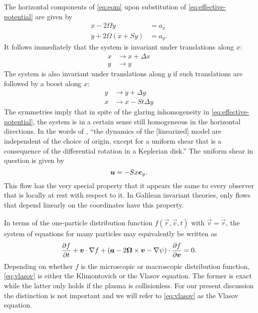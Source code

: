 \documentclass[aps,pre,notitlepage,amsmath,amssymb,amsfonts,nobibnotes,nofootinbib,superscriptaddress,onecolumn,a4paper,10pt]{revtex4-1}
\begin{document}
The horizontal components of \cref{eq:eom} upon substitution of
\cref{eq:effective-potential} are given by
\begin{align}
  \ddot{x} - 2\Omega\dot{y} &= a_x \\
  \label{eq:eom-y}
  \ddot{y} + 2\Omega(\dot{x} + Sy) &= a_y.
\end{align}
It follows immediately that the system is invariant under translations along
$x$:
\begin{equation}
  \label{eq:trans-x}
  \begin{aligned}
    x &\to x + \Delta x \\
    y &\to y
  \end{aligned}
\end{equation}
The system is also invariant under translations along $y$ if such translations
are followed by a boost along $x$:
\begin{equation}
  \label{eq:trans-y}
  \begin{aligned}
    y &\to y + \Delta y \\
    x &\to x - St\Delta y
  \end{aligned}
\end{equation}
The symmetries  imply that in spite of the
glaring inhomogeneity in \cref{eq:effective-potential}, the system is in a
certain sense still homogeneous in the horizontal directions. In the words of
\citet{Wisdom1988}, ``the dynamics of the [linearized] model are independent
of the choice of origin, except for a uniform shear that is a consequence of
the differential rotation in a Keplerian disk.'' The uniform shear in question
is given by
\begin{equation}
  \label{eq:shear-flow}
  \bm{u} = -Sx\bm{e}_y.
\end{equation}
This flow has the very special property that it appears the same to every
observer that is locally at rest with respect to it. In Galilean invariant
theories, only flows that depend linearly on the coordinates have this
property.

In terms of the one-particle distribution function $f(\vec{r},\vec{v},t)$ with
$\vec{v}=\dot{\vec{r}}$, the system of equations  for many
particles may equivalently be written as
\begin{equation}
  \label{eq:vlasov}
  \frac{\partial f}{\partial t} + \bm{v}\cdot\nabla f
  + (\bm{a} - 2\bm{\Omega}\times\bm{v} - \nabla\psi)\cdot\frac{\partial f}{\partial\bm{v}}
  = 0.
\end{equation}
Depending on whether $f$ is the microscopic or macroscopic distribution
function, \cref{eq:vlasov} is either the Klimontovich or the Vlasov equation.
The former is exact while the latter only holds if the plasma is
collisionless. For our present discussion the distinction is not important and
we will refer to \cref{eq:vlasov} as the Vlasov equation.
\end{document}
